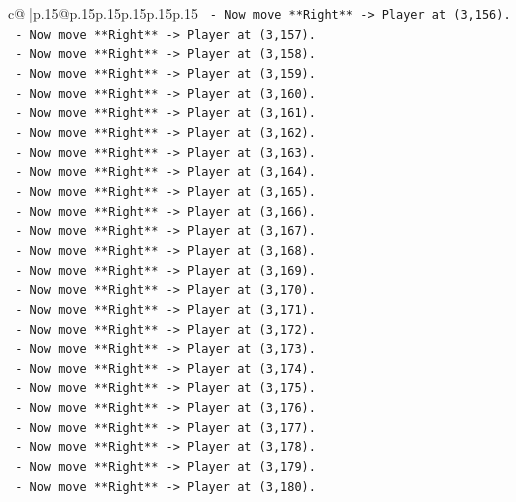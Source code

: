 \documentclass{article}
\begin{document}
{\begin{supertabular}{c@{$\;$}|p{.15\linewidth}@{}p{.15\linewidth}p{.15\linewidth}p{.15\linewidth}p{.15\linewidth}p{.15\linewidth}}
{{{\texttt{    {-}   Now move **Right** {-}> Player at (3,156).} \\
\texttt{    {-}   Now move **Right** {-}> Player at (3,157).} \\
\texttt{    {-}   Now move **Right** {-}> Player at (3,158).} \\
\texttt{    {-}   Now move **Right** {-}> Player at (3,159).} \\
\texttt{    {-}   Now move **Right** {-}> Player at (3,160).} \\
\texttt{    {-}   Now move **Right** {-}> Player at (3,161).} \\
\texttt{    {-}   Now move **Right** {-}> Player at (3,162).} \\
\texttt{    {-}   Now move **Right** {-}> Player at (3,163).} \\
\texttt{    {-}   Now move **Right** {-}> Player at (3,164).} \\
\texttt{    {-}   Now move **Right** {-}> Player at (3,165).} \\
\texttt{    {-}   Now move **Right** {-}> Player at (3,166).} \\
\texttt{    {-}   Now move **Right** {-}> Player at (3,167).} \\
\texttt{    {-}   Now move **Right** {-}> Player at (3,168).} \\
\texttt{    {-}   Now move **Right** {-}> Player at (3,169).} \\
\texttt{    {-}   Now move **Right** {-}> Player at (3,170).} \\
\texttt{    {-}   Now move **Right** {-}> Player at (3,171).} \\
\texttt{    {-}   Now move **Right** {-}> Player at (3,172).} \\
\texttt{    {-}   Now move **Right** {-}> Player at (3,173).} \\
\texttt{    {-}   Now move **Right** {-}> Player at (3,174).} \\
\texttt{    {-}   Now move **Right** {-}> Player at (3,175).} \\
\texttt{    {-}   Now move **Right** {-}> Player at (3,176).} \\
\texttt{    {-}   Now move **Right** {-}> Player at (3,177).} \\
\texttt{    {-}   Now move **Right** {-}> Player at (3,178).} \\
\texttt{    {-}   Now move **Right** {-}> Player at (3,179).} \\
\texttt{    {-}   Now move **Right** {-}> Player at (3,180).} \\
}}}
\end{supertabular}}
\end{document}
